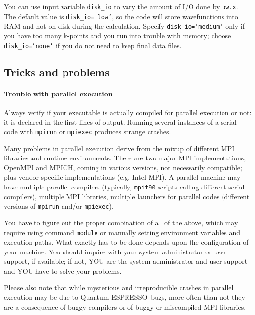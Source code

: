 \documentclass[12pt,a4paper]{article}
\def\qe{{\sc Quantum ESPRESSO}}
\def\pwx{\texttt{pw.x}}
\def\cpx{\texttt{cp.x}}
\begin{document}
You can use input variable \texttt{disk\_io} to vary the
amount of I/O done by \pwx. The default value is
\texttt{disk\_io='low'}, so the code will store wavefunctions
into RAM and not on disk during the calculation. Specify
\texttt{disk\_io='medium'} only if you have too many k-points
and you run into trouble with memory; choose \texttt{disk\_io='none'}
if you do not need to keep final data files.


\subsection{Tricks and problems}
\label{SubSec:badpara}

\paragraph{Trouble with parallel execution}
Always verify if your executable is actually compiled for
parallel execution or not: it is declared in the first lines
of output. Running several instances of a serial code with
\texttt{mpirun} or \texttt{mpiexec} produces strange crashes.

Many problems in parallel execution derive from the mixup of different
MPI libraries and runtime environments. There are two major MPI
implementations, OpenMPI and MPICH, coming in various versions,
not necessarily compatible; plus vendor-specific implementations
(e.g. Intel MPI). A parallel machine may have multiple parallel
compilers (typically, \texttt{mpif90} scripts calling different
serial compilers), multiple MPI libraries, multiple launchers
for parallel codes (different versions of \texttt{mpirun} and/or
\texttt{mpiexec}). 

You have to figure out the proper combination
of all of the above, which may require using command \texttt{module}
or manually setting environment variables and execution paths.
What exactly has to be done depends upon the configuration of your
machine. You should inquire with your system administrator or user
support, if available; if not, YOU are the system administrator
and user support and YOU have to solve your problems.

Please also note that while mysterious and irreproducible crashes
in parallel execution may be due to \qe\ bugs, more often than not 
they are a consequence of buggy compilers or of buggy or miscompiled 
MPI libraries.
\end{document}
